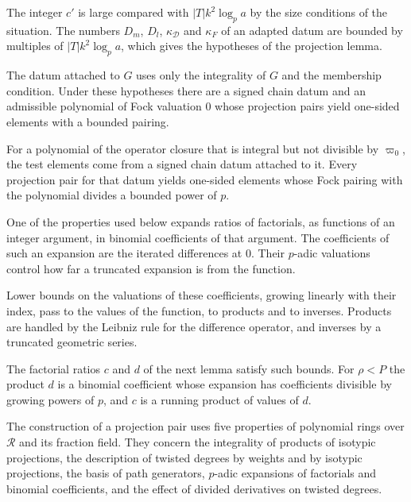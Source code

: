 The integer $c'$ is large compared with $|T|k^2\log_pa$ by the size conditions of the situation. The numbers $D_m$,
$D_l$, $\kappa_{\mathcal D}$ and $\kappa_F$ of an adapted datum are bounded by multiples of $|T|k^2\log_pa$, which gives
the hypotheses of the projection lemma.

The datum attached to $G$ uses only the integrality of $G$ and the membership condition. Under these hypotheses there are a signed chain datum and an admissible polynomial of Fock valuation $0$ whose
projection pairs yield one-sided elements with a bounded pairing.

For a polynomial of the operator closure that is integral but not divisible by $\varpi_0$, the test elements
come from a signed chain datum attached to it. Every projection pair for that datum yields one-sided
elements whose Fock pairing with the polynomial divides a bounded power of $p$.

One of the properties used below expands ratios of factorials, as functions of an integer argument, in binomial
coefficients of that argument. The coefficients of such an expansion are the iterated differences at $0$. Their
$p$-adic valuations control how far a truncated expansion is from the function.

Lower bounds on the valuations of these coefficients, growing linearly with their index, pass to the values of the
function, to products and to inverses. Products are handled by the Leibniz rule for the difference operator, and
inverses by a truncated geometric series.

The factorial ratios $c$ and $d$ of the next lemma satisfy such bounds. For $\rho<P$ the product $d$ is a binomial
coefficient whose expansion has coefficients divisible by growing powers of $p$, and $c$ is a running product of
values of $d$.

The construction of a projection pair uses five properties of polynomial rings over $\mathcal R$ and its fraction
field. They concern the integrality of products of isotypic projections, the description of twisted degrees by weights
and by isotypic projections, the basis of path generators, $p$-adic expansions of factorials and binomial coefficients,
and the effect of divided derivatives on twisted degrees.

